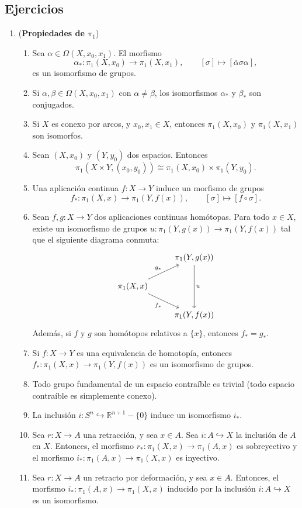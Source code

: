 \documentclass[11pt,a4paper]{article}
\theoremstyle{plain}
\theoremstyle{definition}
\theoremstyle{remark}
\newcommand{\RR}{\mathbb R}
\begin{document}
\subsection*{Ejercicios}

\begin{enumerate}[label=\arabic*.,leftmargin=*]

\item (\textbf{Propiedades de $\pi_1$})
\begin{enumerate}[label=\alph*)]
\item Sea $\alpha\in\Omega(X,x_0,x_1)$. El morfismo
\[
\alpha_*:\pi_1(X,x_0)\to\pi_1(X,x_1), \qquad [\sigma]\mapsto[\overline\alpha\sigma\alpha],
\]
es un isomorfismo de grupos.
\item Si $\alpha,\beta\in\Omega(X,x_0,x_1)$ con $\alpha\ne\beta$, los
isomorfismos $\alpha_*$ y $\beta_*$ son conjugados.
\item Si $X$ es conexo por arcos, y $x_0,x_1\in X$, entonces $\pi_1(X,x_0)$
y $\pi_1(X,x_1)$ son isomorfos.
\item Sean $(X,x_0)$ y $(Y,y_0)$ dos espacios. Entonces
\[
\pi_1(X\times Y,(x_0,y_0))\cong\pi_1(X,x_0)\times\pi_1(Y,y_0).
\]
\item Una aplicación continua $f:X\to Y$ induce un morfismo de grupos
\[
f_*:\pi_1(X,x)\to\pi_1(Y,f(x)), \qquad [\sigma]\mapsto[f\circ\sigma].
\]
\item Sean $f,g:X\to Y$ dos aplicaciones continuas homótopas. Para todo
$x\in X$, existe un isomorfismo de grupos $u:\pi_1(Y,g(x))\to\pi_1(Y,f(x))$
tal que el siguiente diagrama conmuta:
\[
\begin{tikzcd}
& \pi_1(Y,g(x)) \arrow[dd,"u"] \\
\pi_1(X,x) \arrow[ur,"g_*"] \arrow[dr,swap,"f_*"] & \\
& \pi_1(Y,f(x))
\end{tikzcd}
\]
Además, si $f$ y $g$ son homótopos relativos a $\{x\}$, entonces $f_*=g_*$.
\item Si $f:X\to Y$ es una equivalencia de homotopía, entonces
$f_*:\pi_1(X,x)\to\pi_1(Y,f(x))$ es un isomorfismo de grupos.
\item Todo grupo fundamental de un espacio contraíble es trivial (todo
espacio contraíble es simplemente conexo).
\item La inclusión $i:S^n\hookrightarrow\RR^{n+1}-\{0\}$ induce un
isomorfismo $i_*$.
\item Sea $r:X\to A$ una retracción, y sea $x\in A$. Sea $i:A\hookrightarrow X$
la inclusión de $A$ en $X$. Entonces, el morfismo $r_*:\pi_1(X,x)\to\pi_1(A,x)$
es sobreyectivo y el morfismo $i_*:\pi_1(A,x)\to\pi_1(X,x)$ es inyectivo.
\item Sea $r:X\to A$ un retracto por deformación, y sea $x\in A$. Entonces,
el morfismo $i_*:\pi_1(A,x)\to\pi_1(X,x)$ inducido por la inclusión
$i:A\hookrightarrow X$ es un isomorfismo.
\end{enumerate}


\end{enumerate}
\end{document}
